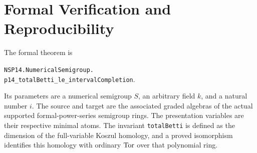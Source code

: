 \section{Formal Verification and Reproducibility}
\label{sec:formalization}
The formal theorem is
\begin{center}
\texttt{NSP14.NumericalSemigroup.}\\
\texttt{p14\_totalBetti\_le\_intervalCompletion}.
\end{center}
Its parameters are a numerical semigroup $S$, an arbitrary field $k$,
and a natural number $i$. The source and target are the associated
graded algebras of the actual supported formal-power-series semigroup
rings. The presentation variables are their respective minimal atoms.
The invariant \texttt{totalBetti} is defined as the dimension of the
full-variable Koszul homology, and a proved isomorphism identifies this
homology with ordinary $\operatorname{Tor}$ over that polynomial ring.


